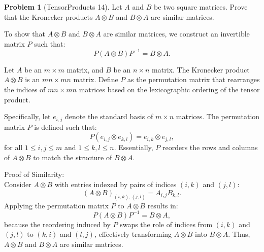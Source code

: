 \documentclass[12pt]{article}
\theoremstyle{definition}
\newtheorem{problem}{Problem}
\begin{document}
\begin{problem}[TensorProducts 14]
    Let $A$ and $B$ be two square matrices. Prove that the Kronecker products $A \otimes B$
    and $B \otimes A$ are similar matrices.

    \begin{solution}
        To show that $A \otimes B$ and $B \otimes A$ are similar matrices, we construct an invertible matrix $P$ such that:
        \[
        P (A \otimes B) P^{-1} = B \otimes A.
        \]

        Let $A$ be an $m \times m$ matrix, and $B$ be an $n \times n$ matrix. The Kronecker product $A \otimes B$ is an $mn \times mn$ matrix. Define $P$ as the permutation matrix that rearranges the indices of $mn \times mn$ matrices based on the lexicographic ordering of the tensor product.

        Specifically, let $e_{i,j}$ denote the standard basis of $m \times n$ matrices. The permutation matrix $P$ is defined such that:
        \[
        P(e_{i,j} \otimes e_{k,l}) = e_{i,k} \otimes e_{j,l},
        \]
        for all $1 \leq i, j \leq m$ and $1 \leq k, l \leq n$. Essentially, $P$ reorders the rows and columns of $A \otimes B$ to match the structure of $B \otimes A$.

        Proof of Similarity:\\
        Consider $A \otimes B$ with entries indexed by pairs of indices $(i,k)$ and $(j,l)$:
        \[
        (A \otimes B)_{(i,k),(j,l)} = A_{i,j} B_{k,l}.
        \]
        Applying the permutation matrix $P$ to $A \otimes B$ results in:
        \[
        P (A \otimes B) P^{-1} = B \otimes A,
        \]
        because the reordering induced by $P$ swaps the role of indices from $(i,k)$ and $(j,l)$ to $(k,i)$ and $(l,j)$, effectively transforming $A \otimes B$ into $B \otimes A$.
        Thus, $A \otimes B$ and $B \otimes A$ are similar matrices.
        
    \end{solution}
\end{problem}
\end{document}
